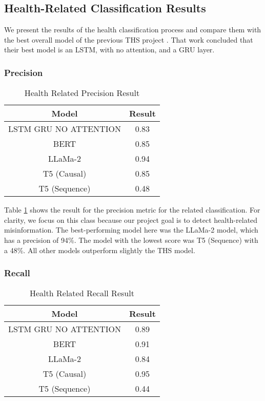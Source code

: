 \subsection{Health-Related Classification Results}
We present the results of the health classification process and compare them with the best overall model of the previous THS project \cite{8622504}. That work concluded
that their best model is an LSTM, with no attention, and a GRU layer.

\subsubsection{Precision}
\begin{table}[H]
	\centering
	\caption{Health Related Precision Result}
	{\small
	\begin{tabular}{||c | c||} 
		\hline
		\textbf{Model} & \textbf{Result} \\ [0.5ex] 
		\hline
		LSTM GRU NO ATTENTION & 0.83  \\
		\hline		
		BERT & 0.85  \\
		\hline
		LLaMa-2 & 0.94 \\ 
		\hline
		T5 (Causal) & 0.85 \\
		\hline
		T5 (Sequence) & 0.48 \\
		\hline
	\end{tabular}
	}
	\label{table:HealthPrecision}
\end{table}

Table \ref{table:HealthPrecision} shows the result for the precision metric for the related classification. For clarity, we focus on this class because our project
goal is to detect health-related misinformation. The best-performing model here was the LLaMa-2 model, which has a precision of 94\%. The model with the lowest
score was T5 (Sequence) with a 48\%. All other models outperform slightly the THS model.

\subsubsection{Recall}
\begin{table}[H]
	\centering
	\caption{Health Related Recall Result}
	{\small
	\begin{tabular}{||c | c||} 
		\hline
		\textbf{Model} & \textbf{Result} \\ [0.5ex] 
		\hline
		LSTM GRU NO ATTENTION & 0.89  \\
		\hline
		BERT & 0.91  \\
		\hline
		LLaMa-2 & 0.84 \\ 
		\hline
		T5 (Causal) & 0.95 \\
		\hline
		T5 (Sequence) & 0.44 \\
		\hline
	\end{tabular}
	}
	\label{table:HealthRecall}
\end{table}

